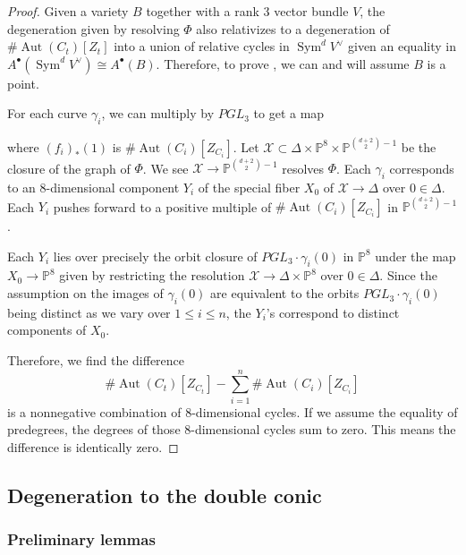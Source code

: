 \documentclass{article}
\theoremstyle{definition}
\newcommand{\on}{\operatorname}
\newcommand{\mb}{\mathbb}
\newcommand{\mc}{\mathcal}
\begin{document}
\begin{proof}
Given a variety $B$ together with a rank 3 vector bundle $V$, the degeneration given by resolving $\Phi$ also relativizes to a degeneration of $\#\on{Aut}(C_t)[Z_t]$ into a union of relative cycles in $\on{Sym}^dV^{\vee}$ given an equality in $A^{\bullet}(\on{Sym}^dV^{\vee})\cong A^{\bullet}(B)$. Therefore, to prove , we can and will assume $B$ is a point. 

For each curve $\gamma_i$, we can multiply by $PGL_3$ to get a map 
\begin{center}
\end{center}
where $(f_i)_{*}(1)$ is $\#\on{Aut}(C_i)[Z_{C_i}]$. Let $\mc{X}\subset \Delta\times \mb{P}^8\times \mb{P}^{\binom{d+2}{2}-1}$ be the closure of the graph of $\Phi$. We see $\mc{X}\to \mb{P}^{\binom{d+2}{2}-1}$ resolves $\Phi$. Each $\gamma_i$ corresponds to an 8-dimensional component $Y_i$ of the special fiber $X_0$ of $\mc{X}\to \Delta$ over $0\in \Delta$. Each $Y_i$ pushes forward to a positive multiple of $\#\on{Aut}(C_i)[Z_{C_i}]$ in $\mb{P}^{\binom{d+2}{2}-1}$. 

Each $Y_i$ lies over precisely the orbit closure of $PGL_3\cdot \gamma_i(0)$ in $\mb{P}^8$ under the map $X_0\to \mb{P}^8$ given by restricting the resolution $\mc{X}\to \Delta\times\mb{P}^8$ over $0\in \Delta$. Since the assumption on the images of $\gamma_i(0)$ are equivalent to the orbits $PGL_3\cdot \gamma_i(0)$ being distinct as we vary over $1\leq i\leq n$, the $Y_i$'s correspond to distinct components of $X_0$. 

Therefore, we find the difference
$$\#\on{Aut}(C_t)[Z_{C_t}]-\sum_{i=1}^{n}\#\on{Aut}(C_i)[Z_{C_i}]$$
is a nonnegative combination of 8-dimensional cycles. If we assume the equality of predegrees, the degrees of those 8-dimensional cycles sum to zero. This means the difference is identically zero. 
\end{proof}

\subsection{Degeneration to the double conic}
\subsubsection{Preliminary lemmas}
\end{document}
